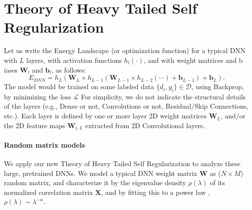 
\section{Theory of Heavy Tailed Self Regularization}
\label{sxn:theory}


Let us write the Energy Landscape (or optimization function) for a typical DNN with $L$ layers, with activation functions $h_{l}(\cdot)$, and with weight matrices and b
iases $\mathbf{W}_{l}$ and $\mathbf{b}_{l}$, as follows:
\begin{equation}
E_{DNN}=h_{L}(\mathbf{W}_{L}\times h_{L-1}(\mathbf{W}_{L-1}\times h_{L-2}(\cdots)+\mathbf{b}_{L-1})+\mathbf{b}_{L})  .
\label{eqn:dnn_energy}
\end{equation}
The model would be trained on some labeled data $\{d_{i},y_{i}\}\in\mathcal{D}$, using Backprop, by minimizing the loss $\mathcal{L}$
For simplicity, we do not indicate the structural details of the layers (e.g., Dense or not, Convolutions or not, Residual/Skip Connections, etc.). 
Each layer is defined by one or more layer 2D weight matrices $\mathbf{W}_{L}$, and/or the 2D feature maps $\mathbf{W}_{i,L}$ 
extracted from 2D Convolutional layers.


\paragraph{Random matrix models} 

We apply our new Theory of Heavy Tailed Self Regularization to analyze these large, pretrained DNNs.  
We model a typical DNN  weight matrix $\mathbf{W}$ as ($N\times M$) random matrix, and characterize it by the eigenvalue density $\rho(\lambda)$ of its normalized
correlation matrix $\mathbf{X}$, and by fitting this to a power law , $\rho(\lambda)\sim\lambda^{-\alpha}$.  

